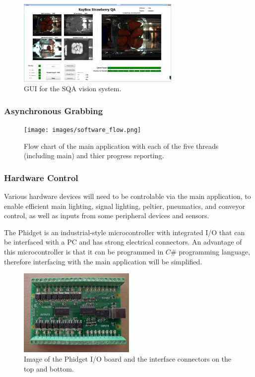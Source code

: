 \documentclass[fleqn,twoside]{article}
\begin{document}
\begin{figure}[h]
	\centering
	\includegraphics[width=0.7\textwidth]{images/GUI.png}
	\caption{GUI for the SQA vision system.}
	\label{fig:GUI}
\end{figure}
  


\subsubsection{Asynchronous Grabbing}




\begin{figure}[p]
	\centering
	\texttt{[image: images/software\_flow.png]}
	\caption{Flow chart of the main application with each of the five threads (including main) and thier progress reporting.}
	\label{fig:software_flow}
\end{figure} 




\subsubsection{Hardware Control}

Various hardware devices will need to be controlable via the main application, to enable efficient main lighting, signal lighting, peltier, pneumatics, and conveyor control, as well as inputs from some peripheral devices and sensors.

The \texttrademark Phidget is an industrial-style microcontroller with integrated I/O that can be interfaced with a PC and has strong electrical connectors. An advantage of this microcontroller is that it can be programmed in $C\#$ programming language, therefore interfacing with the main application will be simplified. 

\begin{figure}
	\begin{center}
		\includegraphics[width=0.5\textwidth]{images/phidget.jpg}
	\end{center}
	\caption{Image of the Phidget \texttrademark I/O board and the interface connectors on the top and bottom.}
	\label{fig:phidget}
\end{figure} 
\end{document}
